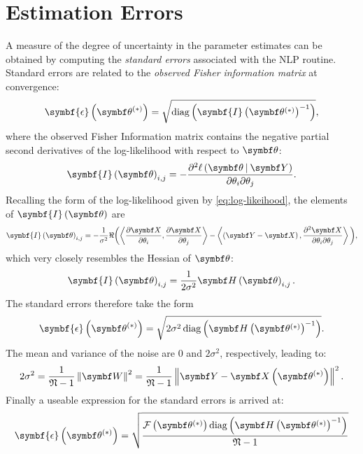\section{Estimation Errors}
\label{subsec:errors}
A measure of the degree of uncertainty in the parameter estimates can be obtained
by computing the \emph{standard errors} associated with the \ac{NLP} routine.
Standard errors are related  to the \emph{observed Fisher information matrix}
at convergence\cite[Section 2.7]{Pawitan2001}:
\begin{equation}
    \symbf{\epsilon}\left(\bthstar\right) = \sqrt{\diag\left(\symbf{I}\left( \bthstar \right)^{-1}\right)},
\end{equation}
where the observed Fisher Information matrix contains the negative partial second
derivatives of the log-likelihood with respect to $\bth$:
\begin{equation}
    \symbf{I}\left(\bth\right)_{i, j} =
        -\frac
        {\partial^2 \ell \left( \bdthY \right)}
        {\partial \theta_i \partial \theta_j}.
\end{equation}
Recalling the form of the log-likelihood given by \cref{eq:log-likeihood},
the elements of $\symbf{I}\left(\bth\right)$ are
\begin{equation}
    \symbf{I}\left(\bth\right)_{i, j} =
        -\frac{1}{\sigma^2}
        \Re
        \biggl(
            \left\langle
                \frac{\partial \bX}{\partial \theta_i},
                \frac{\partial \bX}{\partial \theta_j}
            \right\rangle
            -
            \left\langle
                \left(\bY - \bX\right),
                \frac{\partial^2 \bX}{\partial \theta_i \partial \theta_j}
            \right\rangle
        \biggl),
\end{equation}
which very closely resembles the Hessian of $\bth$:
\begin{equation}
    \symbf{I}\left(\bth\right)_{i,j} =
        \frac{1}{2 \sigma^2}
            \bdHth_{i,j}.
\end{equation}
The standard errors therefore take the form
\begin{equation}
    \symbf{\epsilon}\left(\bthstar\right) =
        \sqrt{
            2\sigma^2 \diag \left(
                \bdHthstar^{-1}
            \right)
        }.
\end{equation}
The mean and variance of the noise are $0$ and $2\sigma^2$, respectively,
leading to:
\begin{equation}
    2 \sigma^2 = \frac{1}{\mathfrak{N} - 1}
    \left\lVert \bW \right\rVert^2 =
    \frac{1}{\mathfrak{N} - 1} \left \lVert
        \bY - \bXthstar
    \right \rVert^2.
\end{equation}
Finally a useable expression for the standard errors is arrived at:
\begin{equation}
    \symbf{\epsilon}\left(\bthstar\right) =
        \sqrt{
            \frac
            {
                \Fthstar \diag \left(
                    \bdHthstar^{-1}
                \right)
            }
            {\mathfrak{N} - 1}
        }
\end{equation}



